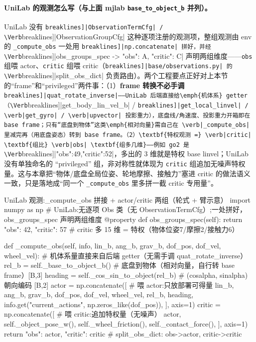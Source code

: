 \paragraph{UniLab 的观测怎么写（与上面 mjlab \texttt{base\_to\_object\_b} 并列）。}UniLab 没有 \Verb[breaklines]|ObservationTermCfg| / \Verb[breaklines]|ObservationGroupCfg| 这种逐项注册的观测项，整组观测由 env 的 \verb|_compute_obs| 一处用 \Verb[breaklines]|np.concatenate| 拼好，并经 \Verb[breaklines]|obs_groups_spec -> {"obs": A, "critic": C}| 声明两组维度——\verb|obs| 组喂 actor、\verb|critic| 组喂 critic（\Verb[breaklines]|base/observations.py| 的 \Verb[breaklines]|split_obs_dict| 负责路由）。两个工程要点正好对上本节的“frame”和“privileged”两件事：（1）\textbf{frame 转换不必手调} \Verb[breaklines]|quat_rotate_inverse|——UniLab 后端直接给\emph{机体系} getter（\Verb[breaklines]|get_body_lin_vel_b| / \Verb[breaklines]|get_local_linvel| / \verb|get_gyro| / \verb|upvector| 投影重力），底盘线/角速度、投影重力开箱即在 base frame；只有“底盘到物体”这类\emph{相对向量}需自己在 \verb|_compute_obs| 里减完再（用底盘姿态）转到 base frame。（2）\textbf{特权观测 =} \verb|critic| \textbf{组比} \verb|obs| \textbf{组多几维}——例如 go2 是 \Verb[breaklines]|{"obs":49,"critic":52}|，多出的 3 维就是特权 base linvel；UniLab 没有单独命名的 “privileged” 组，非对称性就体现为 \verb|critic| 组追加无噪声特权量。这与本章把“物体/底盘全局位姿、轮地摩擦、接触力”塞进 critic 的做法语义一致，只是落地成“同一个 \verb|_compute_obs| 里多拼一截 critic 专用量”。

\begin{codebox}[Python]{UniLab 观测:\_compute\_obs 拼接 + actor/critic 两组（轮式 + 臂示意）}
import numpy as np
# UniLab:无逐项 Obs 类（无 ObservationTermCfg）;一处拼好，obs_groups_spec 声明两组维度
@property
def obs_groups_spec(self):
    return {"obs": 42, "critic": 57}               # critic 多 15 维 = 特权（物体位姿7/摩擦2/接触力6）

def _compute_obs(self, info, lin_b, ang_b, grav_b, dof_pos, dof_vel, wheel_vel):
    # 机体系量直接来自后端 getter（无需手调 quat_rotate_inverse）
    rel_b = self._base_to_object_b()               # 底盘到物体（相对向量，自行转 base frame）[B,3]
    heading = self._cos_sin_to_object(rel_b)       # (cosalpha, sinalpha) 朝向编码 [B,2]
    actor = np.concatenate([                       # 喂 actor:只放部署可得量
        lin_b, ang_b, grav_b, dof_pos, dof_vel, wheel_vel, rel_b, heading,
        info.get("current_actions", np.zeros_like(dof_pos)),
    ], axis=1)
    critic = np.concatenate([                      # 喂 critic:追加特权量（无噪声）
        actor, self._object_pose_w(), self._wheel_friction(), self._contact_force(),
    ], axis=1)
    return {"obs": actor, "critic": critic}        # split_obs_dict: obs->actor, critic->critic
\end{codebox}

